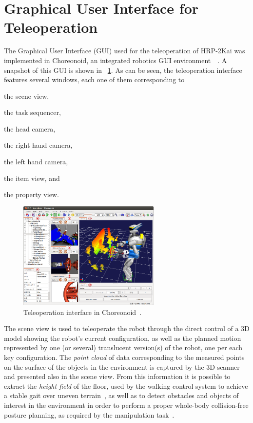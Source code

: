 \section{Graphical User Interface for Teleoperation}
	\label{sec:teleoperation_gui}
	
	The Graphical User Interface (GUI) used for the teleoperation of HRP-2Kai was implemented
	in Choreonoid, an integrated robotics GUI environment~\cite{Choreonoid}~\cite{Nakaoka_Choreonoid}.
	A snapshot of this GUI is shown in \figurename~\ref{fig:Choreonoid2}.
	As can be seen, the teleoperation interface features several windows, each one of them
	corresponding to
	\begin{inparaenum}[(1)]
		\item the scene view,
		\item the task sequencer,
		\item the head camera,
		\item the right hand camera,
		\item the left hand camera,
		\item the item view, and
		\item the property view.
	\end{inparaenum}
		
	\begin{figure}[t]
		\centering
		\includegraphics[height = 5.35cm]{img/Choreonoid2}
		\caption{Teleoperation interface in Choreonoid~\cite{Nakaoka_Humanoids}.}
		\label{fig:Choreonoid2}
	\end{figure}
	
	The scene view is used to teleoperate the robot through the direct control of a 3D model
	showing the robot's current configuration, as well as the planned motion represented by
	one (or several) translucent version(s) of the robot, one per each key configuration.
	The \emph{point cloud} of data corresponding to the measured points on the surface of the
	objects in the environment is captured by the 3D scanner and presented also in the scene view.
	From this information it is possible to extract the \emph{height field} of the floor,
	used by the walking control system to achieve a stable gait over uneven terrain~\cite{Morisawa},
	as well as to detect obstacles and objects of interest in the environment in order to perform
	a proper whole-body collision-free posture planning, as required by the manipulation
	task~\cite{Kanoun}.
	
